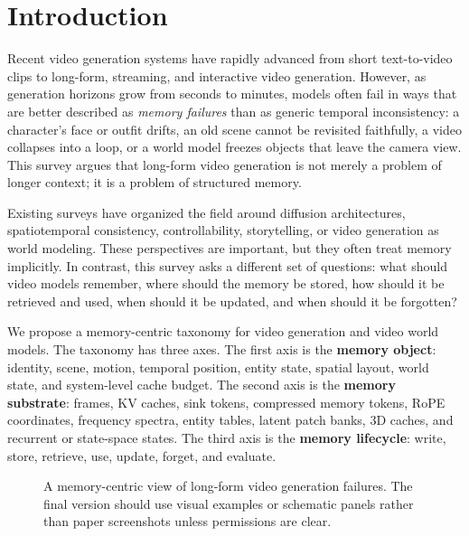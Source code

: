 \section{Introduction}

Recent video generation systems have rapidly advanced from short text-to-video clips to long-form, streaming, and interactive video generation. However, as generation horizons grow from seconds to minutes, models often fail in ways that are better described as \emph{memory failures} than as generic temporal inconsistency: a character's face or outfit drifts, an old scene cannot be revisited faithfully, a video collapses into a loop, or a world model freezes objects that leave the camera view. This survey argues that long-form video generation is not merely a problem of longer context; it is a problem of structured memory.

Existing surveys have organized the field around diffusion architectures, spatiotemporal consistency, controllability, storytelling, or video generation as world modeling. These perspectives are important, but they often treat memory implicitly. In contrast, this survey asks a different set of questions: what should video models remember, where should the memory be stored, how should it be retrieved and used, when should it be updated, and when should it be forgotten?

We propose a memory-centric taxonomy for video generation and video world models. The taxonomy has three axes. The first axis is the \textbf{memory object}: identity, scene, motion, temporal position, entity state, spatial layout, world state, and system-level cache budget. The second axis is the \textbf{memory substrate}: frames, KV caches, sink tokens, compressed memory tokens, RoPE coordinates, frequency spectra, entity tables, latent patch banks, 3D caches, and recurrent or state-space states. The third axis is the \textbf{memory lifecycle}: write, store, retrieve, use, update, forget, and evaluate.

\begin{figure}[t]
\centering
{}
\caption{A memory-centric view of long-form video generation failures. The final version should use visual examples or schematic panels rather than paper screenshots unless permissions are clear.}
\label{fig:failure_taxonomy}
\end{figure}


